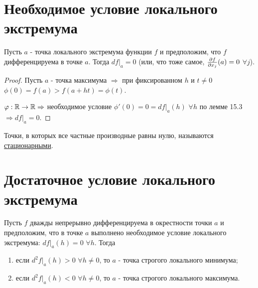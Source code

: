    \section{Необходимое условие локального экстремума}
    \begin{theorem}
    	Пусть $a$ - точка локального экстремума функции $f$ и предположим, что $f$ дифференцируема в точке $a$. Тогда $df|_a = 0$ (или, что тоже самое, $\frac{\partial f}{\partial x_j}(a) = 0$ $\forall j$).
    \end{theorem}
    
    \begin{proof}
    	Пусть $a$ - точка максимума $\Rightarrow$ при фиксированном $h$ и $t \neq 0$ $\phi(0) = f(a) > f(a + ht) = \phi(t)$.
    	
    	$\varphi: \mathbb R \rightarrow \mathbb R \Rightarrow$ необходимое условие $\phi'(0) = 0 = df|_a(h)$ $\forall h$ по лемме 15.3 $\Rightarrow df|_a = 0$.
    \end{proof}
    
    \begin{definition}
    	Точки, в которых все частные производные равны нулю, называются \underline{стационарными}.
    \end{definition}
    
    \section{Достаточное условие локального экстремума}
    
    \begin{theorem}
    	Пусть $f$ дважды непрерывно дифференцируема в окрестности точки $a$ и предположим, что в точке $a$ выполнено необходимое условие локального экстремума: $df|_a(h) = 0$ $\forall h$. Тогда
    	\begin{enumerate}
    		\item если $d^2f|_a(h) > 0$ $\forall h \neq 0$, то $a$ - точка строгого локального минимума;
    		\item если $d^2f|_a(h) < 0$ $\forall h \neq 0$, то $a$ - точка строгого локального максимума.
    	\end{enumerate}
    \end{theorem}
    
